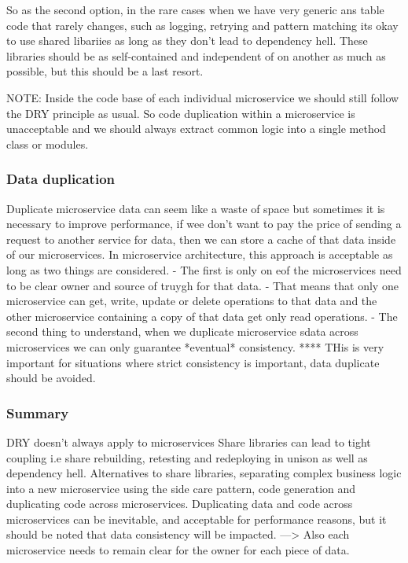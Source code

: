 \documentclass[a4paper, 11pt]{book}
\begin{document}
    So as the second option, in the rare cases when we have very generic ans table code that rarely changes, such as logging, retrying and pattern matching its okay to use shared libariies as long as they don't lead to dependency hell.
    These libraries should be as self-contained and independent of on another as much as possible, but this should be a last resort.

    NOTE: Inside the code base of each individual microservice we should still follow the DRY principle as usual.
    So code duplication within a microservice is unacceptable and we should always extract common logic into a single method class or modules.

    \subsubsection{Data duplication}
    Duplicate microservice data can seem like a waste of space but sometimes it is necessary to improve performance, if wee don't want to pay the price of sending a request to another service for data, then we can store a cache of that data inside of our microservices.
    In microservice architecture, this approach is acceptable as long as two things are considered.
    - The first is only on eof the microservices need to be clear owner and source of truygh for that data.
    - That means that only one microservice can get, write, update or delete operations to that data and the other microservice containing a copy of that data get only read operations.
    - The second thing to understand, when we duplicate microservice sdata across microservices we can only guarantee *eventual* consistency.
    **** THis is very important for situations where strict consistency is important, data duplicate should be avoided.

    \subsubsection{Summary}
    DRY doesn't always apply to microservices
    Share libraries can lead to tight coupling i.e share rebuilding, retesting and redeploying in unison as well as dependency hell.
    Alternatives to share libraries, separating complex business logic into a new microservice using the side care pattern, code generation and duplicating code across microservices.
    Duplicating data and code across microservices can be inevitable, and acceptable for performance reasons, but it should be noted that data consistency will be impacted.
    ---> Also each microservice needs to remain clear for the owner for each piece of data.
\end{document}
